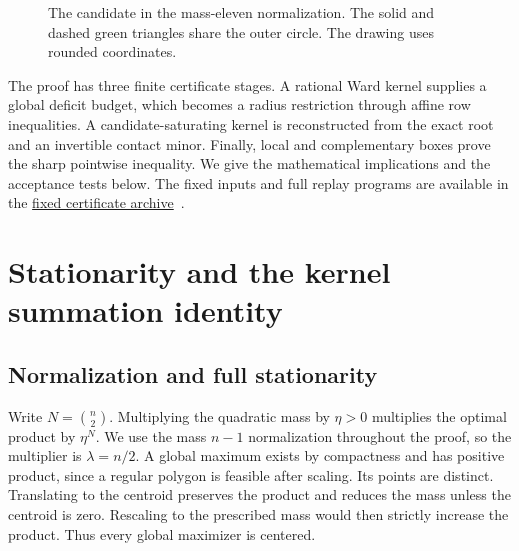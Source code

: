 \documentclass[11pt,letterpaper]{article}
\theoremstyle{remark}
\newcommand{\certroot}{\href{https://github.com/harrykane8816627373-cell/mordell-research/tree/3c922f3446f4f32441d75aef1d7907d38b0544f7}{fixed certificate archive}}
\begin{document}
\begin{figure}[tb]
\centering
{}
\caption{The candidate in the mass-eleven normalization. The solid and dashed green
triangles share the outer circle. The drawing uses rounded coordinates.}
\label{fig:candidate}
\end{figure}

The proof has three finite certificate stages. A rational Ward kernel supplies
a global deficit budget, which becomes a radius restriction through affine
row inequalities. A candidate-saturating kernel is reconstructed from the
exact root and an invertible contact minor. Finally, local and complementary
boxes prove the sharp pointwise inequality. We give the mathematical
implications and the acceptance tests below. The fixed inputs and full replay
programs are available in the \certroot~\cite{archive}.

\section{Stationarity and the kernel summation identity}
\label{sec:ward}

\subsection{Normalization and full stationarity}
Write \(N=\binom{n}{2}\). Multiplying the quadratic mass by \(\eta>0\)
multiplies the optimal product by \(\eta^N\). We use the mass \(n-1\)
normalization throughout the proof, so the multiplier is \(\lambda=n/2\).
A global maximum exists by compactness and has positive product, since
a regular polygon is feasible after scaling. Its points are distinct.
Translating to the centroid preserves the product and reduces the mass
unless the centroid is zero. Rescaling to the prescribed mass would then
strictly increase the product. Thus every global maximizer is centered.
\end{document}
